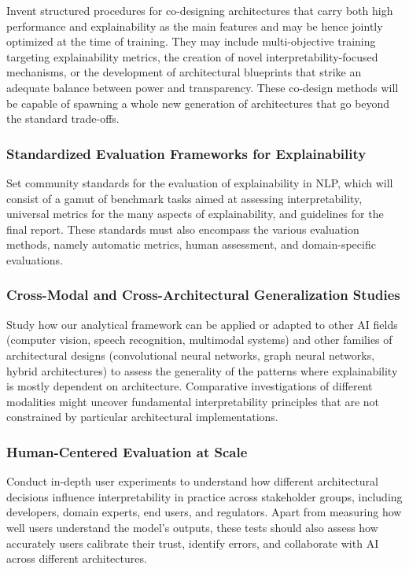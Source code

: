 \documentclass[preprint,12pt]{elsarticle}
\begin{document}
Invent structured procedures for co-designing architectures that carry both high performance and explainability as the main features and may be hence jointly optimized at the time of training. They may include multi-objective training targeting explainability metrics, the creation of novel interpretability-focused mechanisms, or the development of architectural blueprints that strike an adequate balance between power and transparency. These co-design methods will be capable of spawning a whole new generation of architectures that go beyond the standard trade-offs.
\subsubsection{Standardized Evaluation Frameworks for Explainability}

Set community standards for the evaluation of explainability in NLP, which will consist of a gamut of benchmark tasks aimed at assessing interpretability, universal metrics for the many aspects of explainability, and guidelines for the final report. These standards must also encompass the various evaluation methods, namely automatic metrics, human assessment, and domain-specific evaluations.

\subsubsection{Cross-Modal and Cross-Architectural Generalization Studies}

Study how our analytical framework can be applied or adapted to other AI fields (computer vision, speech recognition, multimodal systems) and other families of architectural designs (convolutional neural networks, graph neural networks, hybrid architectures) to assess the generality of the patterns where explainability is mostly dependent on architecture. Comparative investigations of different modalities might uncover fundamental interpretability principles that are not constrained by particular architectural implementations.

\subsubsection{Human-Centered Evaluation at Scale}

Conduct in-depth user experiments to understand how different architectural decisions influence interpretability in practice across stakeholder groups, including developers, domain experts, end users, and regulators. Apart from measuring how well users understand the model's outputs, these tests should also assess how accurately users calibrate their trust, identify errors, and collaborate with AI across different architectures.
\end{document}
